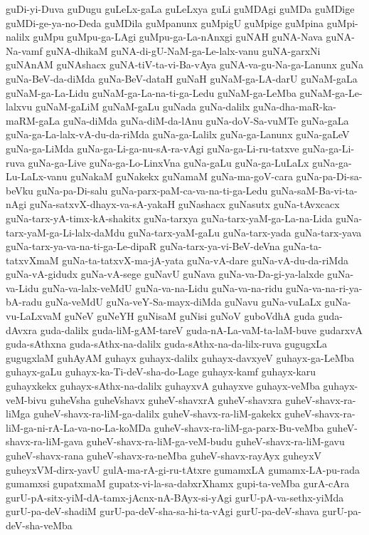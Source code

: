 {guDi-yi-Duva
guDugu
guLeLx-gaLa
guLeLxya
guLi
guMDAgi
guMDa
guMDige
guMDi-ge-ya-no-Deda
guMDila
guMpanunx
guMpigU
guMpige
guMpina
guMpi-nalilx
guMpu
guMpu-ga-LAgi
guMpu-ga-La-nAnxgi
guNAH
guNA-Nava
guNA-Na-vamf
guNA-dhikaM
guNA-di-gU-NaM-ga-Le-lalx-vanu
guNA-garxNi
guNAnAM
guNAshacx
guNA-tiV-ta-vi-Ba-vAya
guNA-va-gu-Na-ga-Lanunx
guNa
guNa-BeV-da-diMda
guNa-BeV-dataH
guNaH
guNaM-ga-LA-darU
guNaM-gaLa
guNaM-ga-La-Lidu
guNaM-ga-La-na-ti-ga-Ledu
guNaM-ga-LeMba
guNaM-ga-Le-lalxvu
guNaM-gaLiM
guNaM-gaLu
guNada
guNa-dalilx
guNa-dha-maR-ka-maRM-gaLa
guNa-diMda
guNa-diM-da-lAnu
guNa-doV-Sa-vuMTe
guNa-gaLa
guNa-ga-La-lalx-vA-du-da-riMda
guNa-ga-Lalilx
guNa-ga-Lanunx
guNa-gaLeV
guNa-ga-LiMda
guNa-ga-Li-ga-nu-sA-ra-vAgi
guNa-ga-Li-ru-tatxve
guNa-ga-Li-ruva
guNa-ga-Live
guNa-ga-Lo-LinxVna
guNa-gaLu
guNa-ga-LuLaLx
guNa-ga-Lu-LaLx-vanu
guNakaM
guNakekx
guNamaM
guNa-ma-goV-cara
guNa-pa-Di-sa-beVku
guNa-pa-Di-salu
guNa-parx-paM-ca-va-na-ti-ga-Ledu
guNa-saM-Ba-vi-ta-nAgi
guNa-satxvX-dhayx-va-sA-yakaH
guNashacx
guNasutx
guNa-tAvxcacx
guNa-tarx-yA-timx-kA-shakitx
guNa-tarxya
guNa-tarx-yaM-ga-La-na-Lida
guNa-tarx-yaM-ga-Li-lalx-daMdu
guNa-tarx-yaM-gaLu
guNa-tarx-yada
guNa-tarx-yava
guNa-tarx-ya-va-na-ti-ga-Le-dipaR
guNa-tarx-ya-vi-BeV-deVna
guNa-ta-tatxvXmaM
guNa-ta-tatxvX-ma-jA-yata
guNa-vA-dare
guNa-vA-du-da-riMda
guNa-vA-gidudx
guNa-vA-sege
guNavU
guNava
guNa-va-Da-gi-ya-lalxde
guNa-va-Lidu
guNa-va-lalx-veMdU
guNa-va-na-Lidu
guNa-va-na-ridu
guNa-va-na-ri-ya-bA-radu
guNa-veMdU
guNa-veY-Sa-mayx-diMda
guNavu
guNa-vuLaLx
guNa-vu-LaLxvaM
guNeV
guNeYH
guNisaM
guNisi
guNoV
guboVdhA
guda
guda-dAvxra
guda-dalilx
guda-liM-gAM-tareV
guda-nA-La-vaM-ta-laM-buve
gudarxvA
guda-sAthxna
guda-sAthx-na-dalilx
guda-sAthx-na-da-lilx-ruva
gugugxLa
gugugxlaM
guhAyAM
guhayx
guhayx-dalilx
guhayx-davxyeV
guhayx-ga-LeMba
guhayx-gaLu
guhayx-ka-Ti-deV-sha-do-Lage
guhayx-kamf
guhayx-karu
guhayxkekx
guhayx-sAthx-na-dalilx
guhayxvA
guhayxve
guhayx-veMba
guhayx-veM-bivu
guheVsha
guheVshavx
guheV-shavxrA
guheV-shavxra
guheV-shavx-ra-liMga
guheV-shavx-ra-liM-ga-dalilx
guheV-shavx-ra-liM-gakekx
guheV-shavx-ra-liM-ga-ni-rA-La-va-no-La-koMDa
guheV-shavx-ra-liM-ga-parx-Bu-veMba
guheV-shavx-ra-liM-gava
guheV-shavx-ra-liM-ga-veM-budu
guheV-shavx-ra-liM-gavu
guheV-shavx-rana
guheV-shavx-ra-neMba
guheV-shavx-rayAyx
guheyxV
guheyxVM-dirx-yavU
gulA-ma-rA-gi-ru-tAtxre
gumamxLA
gumamx-LA-pu-rada
gumamxsi
gupatxmaM
gupatx-vi-la-sa-dabxrXhamx
gupi-ta-veMba
gurA-cAra
gurU-pA-sitx-yiM-dA-tamx-jAcnx-nA-BAyx-si-yAgi
gurU-pA-va-sethx-yiMda
gurU-pa-deV-shadiM
gurU-pa-deV-sha-sa-hi-ta-vAgi
gurU-pa-deV-shava
gurU-pa-deV-sha-veMba
}
